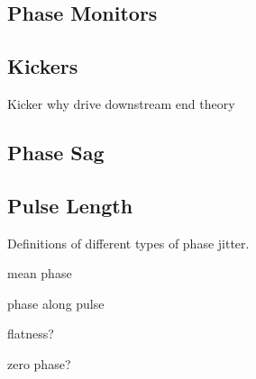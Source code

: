 \subsection{Phase Monitors}
\label{ss:phMons}

\subsection{Kickers}
\label{ss:kickers}

Kicker why drive downstream end theory



\subsection{Phase Sag}
\label{ss:phaseSag}

\subsection{Pulse Length}
\label{ss:pulseLength}





Definitions of different types of phase jitter.


mean phase

phase along pulse

flatness?

zero phase?